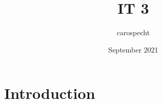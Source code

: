 \documentclass{article}
\title{IT 3}
\author{carospecht }
\date{September 2021}
\begin{document}
\maketitle

\section{Introduction}
\end{document}
